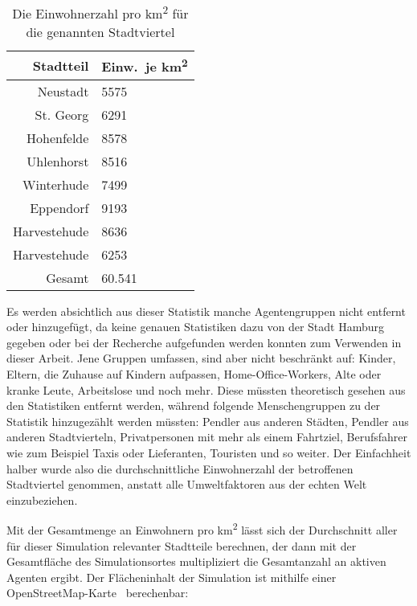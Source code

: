 \begin{table}
    \centering
    \begin{tabular}{||r|l||}
        \hline
        Stadtteil    & Einw.~je km\textsuperscript{2} \\\hline\hline
        Neustadt     & 5575                           \\\hline
        St. Georg    & 6291                           \\\hline
        Hohenfelde   & 8578                           \\\hline
        Uhlenhorst   & 8516                           \\\hline
        Winterhude   & 7499                           \\\hline
        Eppendorf    & 9193                           \\\hline
        Harvestehude & 8636                           \\\hline
        Harvestehude & 6253                           \\\hline\hline
        Gesamt       & 60.541                         \\\hline
    \end{tabular}
    \centering
    \caption{Die Einwohnerzahl pro km\textsuperscript{2} für die genannten Stadtviertel}
    \label{tab:citizen-per-district}
\end{table}

Es werden absichtlich aus dieser Statistik manche Agentengruppen nicht entfernt oder hinzugefügt, da keine genauen Statistiken dazu von der Stadt Hamburg gegeben oder bei der Recherche aufgefunden werden konnten zum Verwenden in dieser Arbeit.
Jene Gruppen umfassen, sind aber nicht beschränkt auf: Kinder, Eltern, die Zuhause auf Kindern aufpassen, Home-Office-Workers, Alte oder kranke Leute, Arbeitslose und noch mehr.
Diese müssten theoretisch gesehen aus den Statistiken entfernt werden, während folgende Menschengruppen zu der Statistik hinzugezählt werden müssten: Pendler aus anderen Städten, Pendler aus anderen Stadtvierteln, Privatpersonen mit mehr als einem Fahrtziel, Berufsfahrer wie zum Beispiel Taxis oder Lieferanten, Touristen und so weiter.
Der Einfachheit halber wurde also die durchschnittliche Einwohnerzahl der betroffenen Stadtviertel genommen, anstatt alle Umweltfaktoren aus der echten Welt einzubeziehen.

Mit der Gesamtmenge an Einwohnern pro km\textsuperscript{2} lässt sich der Durchschnitt aller für dieser Simulation relevanter Stadtteile berechnen, der dann mit der Gesamtfläche des Simulationsortes multipliziert die Gesamtanzahl an aktiven Agenten ergibt.
Der Flächeninhalt der Simulation ist mithilfe einer OpenStreetMap-Karte~\cite{OSF2004} berechenbar:

